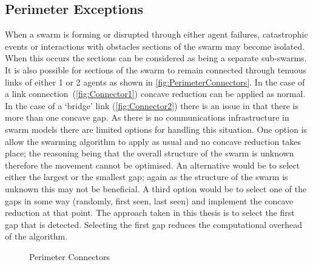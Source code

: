 \subsection{Perimeter Exceptions}\label{concave:Exceptions}
When a swarm is forming or disrupted through either agent failures, catastrophic events or interactions with obstacles sections of the swarm may become isolated. When this occurs the sections can be considered as being a separate sub-swarms. It is also possible for sections of the swarm to remain connected through tenuous links of either 1 or 2 agents as shown in \autoref{fig:PerimeterConnectors}. In the case of a link connection~(\autoref{fig:Connector1}) concave reduction can be applied as normal. In the case of a `bridge' link (\autoref{fig:Connector2}) there is an issue in that there is more than one concave gap. As there is no communications infrastructure in swarm models there are limited options for handling this situation. One option is allow the swarming algorithm to apply as usual and no concave reduction takes place; the reasoning being that the overall structure of the swarm is unknown therefore the movement cannot be optimised. An alternative would be to select either the largest or the smallest gap; again as the structure of the swarm is unknown this may not be beneficial. A third option would be to select one of the gaps in some way (randomly, first seen, last seen) and implement the concave reduction at that point. The approach taken in this thesis is to select the first gap that is detected. Selecting the first gap reduces the computational overhead of the algorithm.

\begin{figure}[H]
\centering
{}
\caption[Perimeter Connectors]{Perimeter Connectors}
\label{fig:PerimeterConnectors}
\end{figure}

